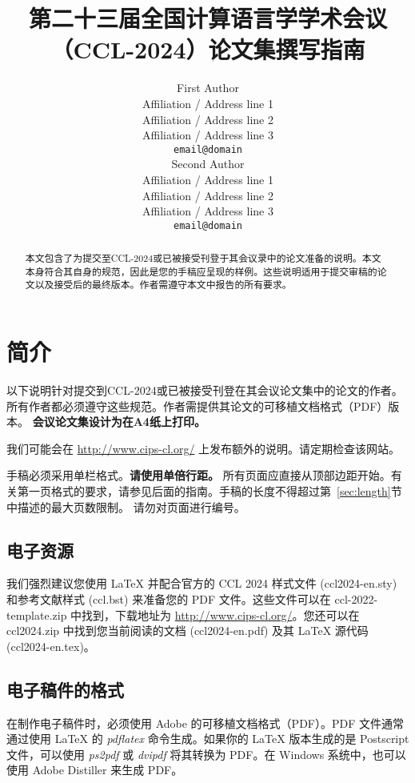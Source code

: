 \documentclass[11pt]{article}
\title{第二十三届全国计算语言学学术会议（CCL-2024）论文集撰写指南}
\author{First Author \\
  Affiliation / Address line 1 \\
  Affiliation / Address line 2 \\
  Affiliation / Address line 3 \\
  {\tt email@domain} \\\And
  Second Author \\
  Affiliation / Address line 1 \\
  Affiliation / Address line 2 \\
  Affiliation / Address line 3 \\
  {\tt email@domain} \\}
\date{}
\begin{document}
\maketitle
\begin{abstract}
  本文包含了为提交至CCL-2024或已被接受刊登于其会议录中的论文准备的说明。本文本身符合其自身的规范，因此是您的手稿应呈现的样例。这些说明适用于提交审稿的论文以及接受后的最终版本。作者需遵守本文中报告的所有要求。
\end{abstract}
\section{简介}
\label{intro}


以下说明针对提交到CCL-2024或已被接受刊登在其会议论文集中的论文的作者。所有作者都必须遵守这些规范。作者需提供其论文的可移植文档格式（PDF）版本。 \textbf{会议论文集设计为在A4纸上打印。}

我们可能会在 \url{http://www.cips-cl.org/} 上发布额外的说明。请定期检查该网站。

手稿必须采用单栏格式。{\bf 请使用单倍行距。} 所有页面应直接从顶部边距开始。有关第一页格式的要求，请参见后面的指南。手稿的长度不得超过第~\ref{sec:length}节中描述的最大页数限制。
请勿对页面进行编号。
\subsection{电子资源}

我们强烈建议您使用 \LaTeX{} 并配合官方的 CCL 2024 样式文件 (ccl2024-en.sty) 和参考文献样式 (ccl.bst) 来准备您的 PDF 文件。这些文件可以在 ccl-2022-template.zip 中找到，下载地址为 \url{http://www.cips-cl.org/}。您还可以在 ccl2024.zip 中找到您当前阅读的文档 (ccl2024-en.pdf) 及其 \LaTeX{} 源代码 (ccl2024-en.tex)。
\subsection{电子稿件的格式}
\label{sect:pdf}

在制作电子稿件时，必须使用 Adobe 的可移植文档格式（PDF）。PDF 文件通常通过使用 \LaTeX{} 的 \textit{pdflatex} 命令生成。如果你的 \LaTeX{} 版本生成的是 Postscript 文件，可以使用 \textit{ps2pdf} 或 \textit{dvipdf} 将其转换为 PDF。在 Windows 系统中，也可以使用 Adobe Distiller 来生成 PDF。
\end{document}
